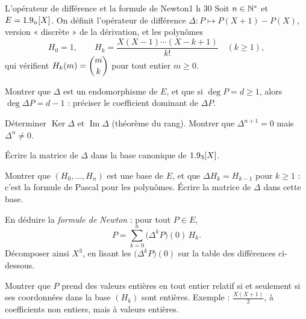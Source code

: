 

\begin{defi}{L'opérateur de différence et la formule de Newton}{1 h 30}
Soit $n\in\mathbb{N}^{*}$ et $E=1.9_n[X]$. On définit l'opérateur de différence
$\Delta:P\mapsto P(X+1)-P(X)$, version « discrète » de la dérivation, et
les polynômes
\[
H_0=1,\qquad H_k=\frac{X(X-1)\cdots(X-k+1)}{k!}\quad(k\geqslant1),
\]
qui vérifient $H_k(m)=\dbinom mk$ pour tout entier $m\geqslant0$.

\begin{questions}
  \item Montrer que $\Delta$ est un endomorphisme de $E$, et que si
    $\deg P=d\geqslant1$, alors $\deg\Delta P=d-1$ : préciser le
    coefficient dominant de $\Delta P$.
  \item Déterminer $\operatorname{Ker}\Delta$ et $\operatorname{Im}\Delta$
    (théorème du rang). Montrer que $\Delta^{n+1}=0$ mais
    $\Delta^{n}\neq0$.
  \item Écrire la matrice de $\Delta$ dans la base canonique de $1.9_3[X]$.
\end{questions}

\begin{questions}[resume]
  \item Montrer que $(H_0,\dots,H_n)$ est une base de $E$, et que
    $\Delta H_k=H_{k-1}$ pour $k\geqslant1$ : c'est la formule de Pascal
    pour les polynômes. Écrire la matrice de $\Delta$ dans cette base.
  \item En déduire la \emph{formule de Newton} : pour tout $P\in E$,
    \[
    P=\sum_{k=0}^{n}\bigl(\Delta^{k}P\bigr)(0)\,H_k .
    \]
    Décomposer ainsi $X^{3}$, en lisant les $\bigl(\Delta^{k}P\bigr)(0)$
    sur la table des différences ci-dessous.
  \item Montrer que $P$ prend des valeurs entières en tout entier relatif
    si et seulement si ses coordonnées dans la base $(H_k)$ sont entières.
    Exemple : $\frac{X(X+1)}{2}$, à coefficients non entiers, mais à
    valeurs entières.
\end{questions}


\end{defi}
